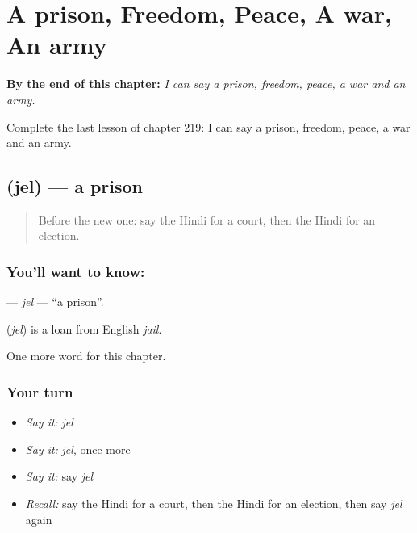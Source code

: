 
\chapter{A prison, Freedom, Peace, A war, An army}
\label{ch:hi-a-prison-freedom-peace-a-war-an-army}

\begin{chapteropening}
\textbf{By the end of this chapter:} \emph{I can say a prison, freedom, peace, a war and an army.}

Complete the last lesson of chapter 219: I can say a prison, freedom, peace, a war and an army.
\end{chapteropening}

\section[\texorpdfstring{\hi{जेल} (jel)}{जेल (jel)}]{ (jel) — a prison}

\label{lesson:HI-C219-jel}



\begin{quote}
Before the new one: say the Hindi for a court, then the Hindi for an election.
\end{quote}

\subsection*{You'll want to know: }
\textbf{} — \emph{jel} — \textquotedblleft{}a prison\textquotedblright{}.

\begin{cousinweb}
\textbf{} (\emph{jel}) is a loan from English \emph{jail}.
\end{cousinweb}

\begin{grammarlens}[title={What you've built}]
One more word for this chapter.
\end{grammarlens}

\subsection*{Your turn}
\begin{itemize}
\raggedright
  \item \emph{Say it:} \emph{jel}
  \item \emph{Say it:} \emph{jel}, once more
  \item \emph{Say it:} say \emph{jel}
  \item \emph{Recall:} say the Hindi for a court, then the Hindi for an election, then say \emph{jel} again
\end{itemize}

